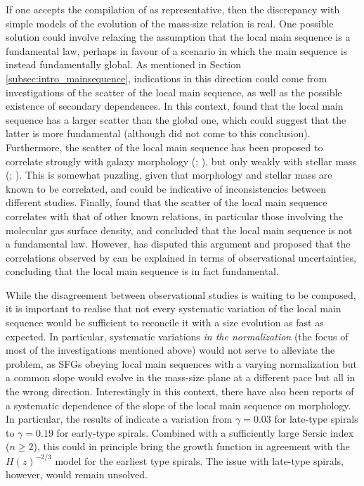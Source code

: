 \documentclass[fleqn,usenatbib]{mnras}
\begin{document}
If one accepts the compilation of \cite{Enia+20} as representative, then the discrepancy with simple models of the evolution of the mass-size relation is real. One possible solution could involve relaxing the assumption that the local main sequence is a fundamental law, perhaps in favour of a scenario in which the main sequence is instead fundamentally global. As mentioned in Section \ref{subsec:intro_mainsequence}, indications in this direction could come from investigations of the scatter of the local main sequence, as well as the possible existence of secondary dependences. In this context, \cite{Vulcani+19} found that the local main sequence has a larger scatter than the global one, which could suggest that the latter is more fundamental (although \citealt{Vulcani+19} did not come to this conclusion). Furthermore, the scatter of the local main sequence has been proposed to correlate strongly with 
galaxy morphology (\citealt{Gonzalez-Delgado+16}; \citealt{Cano-Diaz+19}), but only weakly with stellar mass (\citealt{Erroz-Ferrer+19}; \citealt{Sanchez2020}). This is somewhat puzzling, given that morphology and stellar mass are known to be correlated, and could be indicative of inconsistencies between different studies. Finally, \cite{Ellison+21} found that the scatter of the local main sequence correlates with that of other known relations, in particular those involving the molecular gas surface density, and concluded that the local main sequence is not a fundamental law. However, \cite{Sanchez+21} has disputed this argument and proposed that the correlations observed by \cite{Ellison+21} can be explained in terms of observational uncertainties, concluding that the local main sequence is in fact fundamental.

While the disagreement between observational studies is waiting to be composed, it is important to realise that not every systematic variation of the local main sequence would be sufficient to reconcile it with a size evolution as fast as expected. In particular, systematic variations \emph{in the normalization} (the focus of most of the investigations mentioned above) would not serve to alleviate the problem, 
as SFGs obeying local main sequences with a varying normalization but a common slope would evolve in the mass-size plane at a different pace but all in the wrong direction. Interestingly in this context, there have also been reports of a systematic dependence of the slope of the local main sequence on morphology. In particular, the results of \cite{Maragkoudakis+17} indicate a variation from $\gamma = 0.03$ for late-type spirals to $\gamma = 0.19$ for early-type spirals. Combined with a sufficiently large Sersic index ($n \geq 2$), this could in principle bring the growth function in agreement with the $H(z)^{-2/3}$ model for the earliest type spirals. The issue with late-type spirals, however, would remain unsolved.
\end{document}
